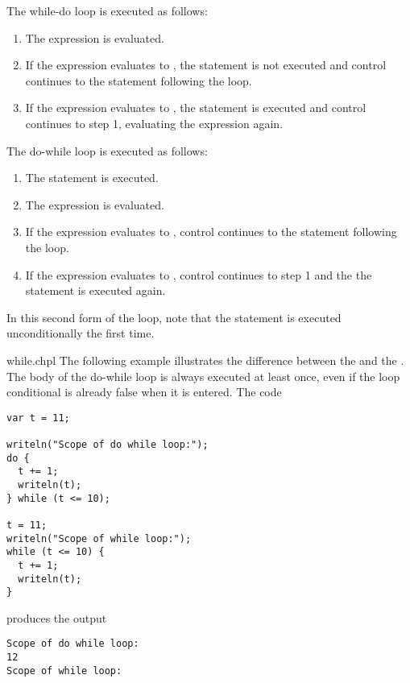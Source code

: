 \pagebreak
The while-do loop is executed as follows:
\begin{enumerate}
\item The expression is evaluated.
\item If the expression evaluates to , the statement is
  not executed and control continues to the statement following the
  loop.
\item If the expression evaluates to , the statement is
  executed and control continues to step 1, evaluating the expression
  again.
\end{enumerate}

The do-while loop is executed as follows:
\begin{enumerate}
\item The statement is executed.
\item The expression is evaluated.
\item If the expression evaluates to , control continues
  to the statement following the loop.
\item If the expression evaluates to , control continues to
  step 1 and the the statement is executed again.
\end{enumerate}
In this second form of the loop, note that the statement is executed
unconditionally the first time.

\begin{chapelexample}{while.chpl}
The following example illustrates the difference between
the  and the .  The body of
the do-while loop is always executed at least once, even if the loop conditional
is already false when it is entered.  The code
\begin{chapel}
\begin{verbatim}
var t = 11;

writeln("Scope of do while loop:");
do {
  t += 1;
  writeln(t);
} while (t <= 10);

t = 11;
writeln("Scope of while loop:");
while (t <= 10) {
  t += 1;
  writeln(t);
}
\end{verbatim}
\end{chapel}
produces the output
\begin{chapelprintoutput}
\begin{verbatim}
Scope of do while loop:
12
Scope of while loop:
\end{verbatim}
\end{chapelprintoutput}
\end{chapelexample}

